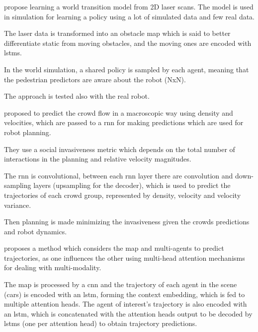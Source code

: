 

\cite{cui2021learning} propose learning a world transition model from 2D laser scans. The model is used in simulation for learning a policy using a lot of simulated data and few real data.

The laser data is transformed into an obstacle map which is said to better differentiate static from moving obstacles, and the moving ones are encoded with \glspl{lstm}.

In the world simulation, a shared policy is sampled by each agent, meaning that the pedestrian predictors are aware about the robot (NxN).

The approach is tested also with the real robot.
	


\cite{kiss2021probabilistic} proposed to predict the crowd flow in a macroscopic way using density and velocities, which are passed to a \gls{rnn} for making predictions which are used for robot planning.

They use a social invasiveness metric which depends on the total number of interactions in the planning and relative velocity magnitudes.

The \gls{rnn} is convolutional, between each \gls{rnn} layer there are convolution and down-sampling layers (upsampling for the decoder), which is used to predict the trajectories of each crowd group, represented by density, velocity and velocity variance.

Then planning is made minimizing the invasiveness given the crowds predictions and robot dynamics.  



\cite{messaoud2021trajectory} proposes a method which considers the map and multi-agents to predict trajectories, as one influences the other using multi-head attention mechanisms for dealing with multi-modality.

The map is processed by a \gls{cnn} and the trajectory of each agent in the scene (cars) is encoded with an \gls{lstm}, forming the context embedding, which is fed to multiple attention heads.
%
The agent of interest's trajectory is also encoded with an \gls{lstm}, which is concatenated with the attention heads output to be decoded by \glspl{lstm} (one per attention head) to obtain trajectory predictions.

